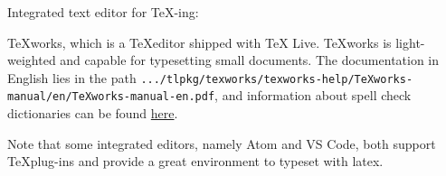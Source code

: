 \documentclass[english]{../TeXTemplate/pkupaper}
\begin{document}
Integrated text editor for \TeX-ing:
\begin{partlist}
\item TeXworks, which is a \TeX editor shipped with TeX Live. TeXworks is light-weighted and capable for typesetting small documents. The documentation in English lies in the path \verb".../tlpkg/texworks/texworks-help/TeXworks-manual/en/TeXworks-manual-en.pdf", and information about spell check dictionaries can be found \href{https://github.com/TeXworks/texworks/wiki/SpellingDictionaries}{here}.
\end{partlist}
Note that some integrated editors, namely Atom and VS Code, both support \TeX plug-ins and provide a great environment to typeset with latex.
\end{document}
